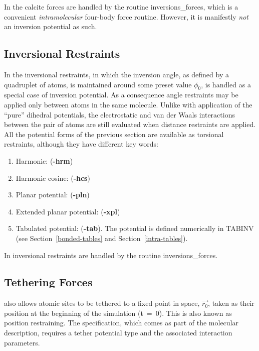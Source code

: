 In \D the calcite forces are handled by the routine
{\sc inversions\_forces}, which is a convenient {\em intramolecular} four-body
force routine. However, it is manifestly {\em not} an inversion potential as such.

\subsection{Inversional Restraints}

In \D the inversional restraints, in which the inversion angle, as defined
by a quadruplet of atoms, is maintained around some preset value $\phi_{0}$,
is handled as a special case of  inversion potential.
As a consequence angle restraints may be applied only between atoms
in the same molecule.  Unlike with application of the ``pure'' dihedral
potentials, the electrostatic and
van der Waals interactions between
the pair of atoms are still evaluated when distance restraints are
applied.  All the potential forms of the previous section are
available as torsional restraints, although they have different key
words:

\begin{enumerate}
\item Harmonic:  ({\bf -hrm})
\item Harmonic cosine:  ({\bf -hcs})
\item Planar potential:  ({\bf -pln})
\item Extended planar potential:  ({\bf -xpl})
\item Tabulated potential:  ({\bf -tab}).  The potential is defined numerically in TABINV (see Section~\ref{bonded-tables} and Section~\ref{intra-tables}).
\end{enumerate}

In \D inversional restraints are handled by
the routine {\sc inversions\_forces}.

\subsection{Tethering Forces}

\D also allows atomic sites to be tethered
to a fixed point in space, $\vec{r_{0}}$, taken as their position
at the beginning of the simulation (t~=~0).  This is also known as
position restraining.  The specification, which comes as part of
the molecular description, requires a tether potential type and
the associated interaction parameters.

